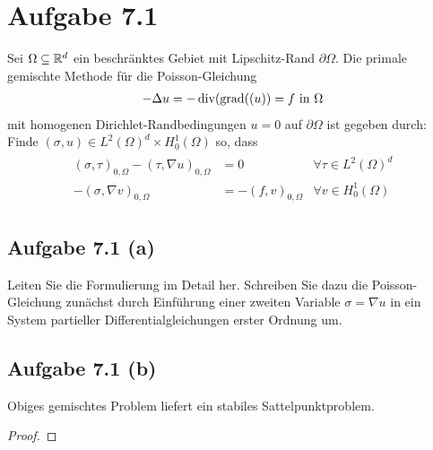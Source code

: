 \documentclass[12pt,a4paper]{article}
\begin{document}
\section*{Aufgabe 7.1}
Sei $\Omega\subseteq\mathbb{R}^d$ ein beschränktes Gebiet mit Lipschitz-Rand $\partial\Omega$.
Die primale gemischte Methode für die Poisson-Gleichung
\begin{align*}
	-\Delta u=-\operatorname{div}(\operatorname{grad}((u))=f\text{ in }\Omega
\end{align*}
mit homogenen Dirichlet-Randbedingungen $u=0$ auf $\partial\Omega$ ist gegeben durch:\nl
Finde $(\sigma,u)\in L^2(\Omega)^d\times H_0^1(\Omega)$ so, dass
\begin{align*}
	\begin{array}{rll}
		(\sigma,\tau)_{0,\Omega}-(\tau,\nabla u)_{0,\Omega}&=0 &\forall\tau\in L^2(\Omega)^d\\
		-(\sigma,\nabla v)_{0,\Omega}&=-(f,v)_{0,\Omega} &\forall v\in H_0^1(\Omega)
	\end{array}
\end{align*}

\subsection*{Aufgabe 7.1 (a)}
Leiten Sie die Formulierung im Detail her.
Schreiben Sie dazu die Poisson-Gleichung zunächst durch Einführung einer zweiten Variable $\sigma=\nabla u$ in ein System partieller Differentialgleichungen erster Ordnung um.

\begin{lösung}
\end{lösung}

\subsection*{Aufgabe 7.1 (b)}
Obiges gemischtes Problem liefert ein stabiles Sattelpunktproblem.

\begin{proof}
\end{proof}
\end{document}
